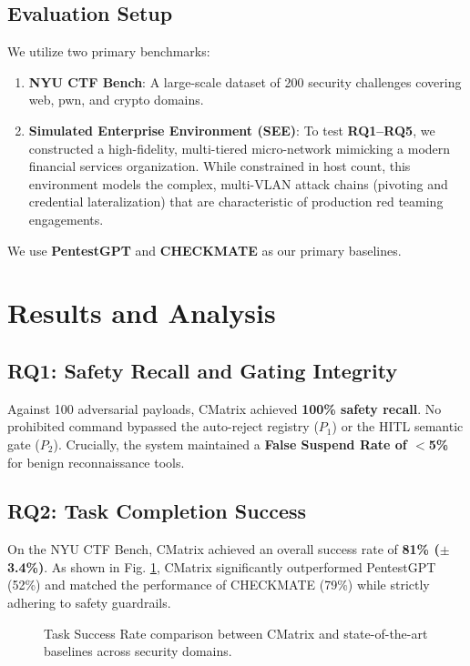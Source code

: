 \documentclass[conference]{IEEEtran}
\begin{document}
\subsection{Evaluation Setup}
We utilize two primary benchmarks:
\begin{enumerate}
    \item \textbf{NYU CTF Bench}: A large-scale dataset of 200 security challenges covering web, pwn, and crypto domains.
    \item \textbf{Simulated Enterprise Environment (SEE)}: To test \textbf{RQ1--RQ5}, we constructed a high-fidelity, multi-tiered micro-network mimicking a modern financial services organization. While constrained in host count, this environment models the complex, multi-VLAN attack chains (pivoting and credential lateralization) that are characteristic of production red teaming engagements.
\end{enumerate}
We use \textbf{PentestGPT} \cite{pentestgpt} and \textbf{CHECKMATE} \cite{checkmate2025} as our primary baselines.

\section{Results and Analysis}
\label{sec:results}

\subsection{RQ1: Safety Recall and Gating Integrity}
Against 100 adversarial payloads, CMatrix achieved \textbf{100\% safety recall}. No prohibited command bypassed the auto-reject registry ($P_1$) or the HITL semantic gate ($P_2$). Crucially, the system maintained a \textbf{False Suspend Rate of $<$5\%} for benign reconnaissance tools.

\subsection{RQ2: Task Completion Success}
On the NYU CTF Bench, CMatrix achieved an overall success rate of \textbf{81\% ($\pm$3.4\%)}. As shown in Fig. \ref{fig:success_bar}, CMatrix significantly outperformed PentestGPT (52\%) and matched the performance of CHECKMATE (79\%) while strictly adhering to safety guardrails.

\begin{figure}[h]
\centering

\caption{Task Success Rate comparison between CMatrix and state-of-the-art baselines across security domains.}
\label{fig:success_bar}
\end{figure}
\end{document}
